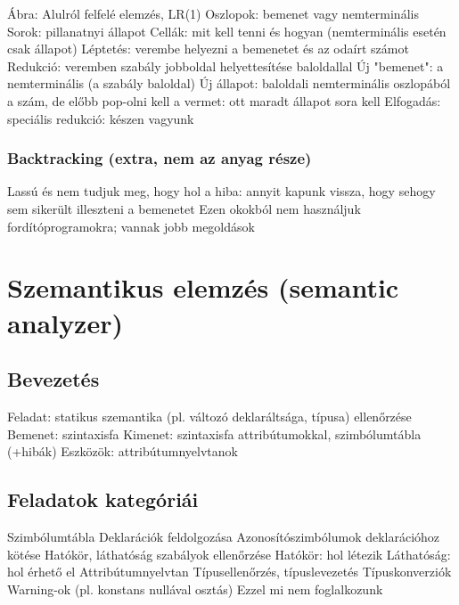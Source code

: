 \documentclass[12pt,a4paper]{article}
\begin{document}
\begin{outline}
	\1 Ábra: Alulról felfelé elemzés, LR(1)
	\2 Oszlopok: bemenet vagy nemterminális
	\2 Sorok: pillanatnyi állapot
	\2 Cellák: mit kell tenni és hogyan (nemterminális esetén csak állapot)
		\3 Léptetés: verembe helyezni a bemenetet és az odaírt számot
		\3 Redukció: veremben szabály jobboldal helyettesítése baloldallal
			\4 Új "bemenet": a nemterminális (a szabály baloldal)
			\4 Új állapot: baloldali nemterminális oszlopából a szám,
			de előbb pop-olni kell a vermet: ott maradt állapot sora kell
		\3 Elfogadás: speciális redukció: készen vagyunk
\end{outline}

\subsubsection{Backtracking (extra, nem az anyag része)}

\begin{outline}
	\1 Lassú és nem tudjuk meg, hogy hol a hiba: annyit kapunk vissza, hogy sehogy sem sikerült illeszteni a bemenetet
	\1 Ezen okokból nem használjuk fordítóprogramokra; vannak jobb megoldások
\end{outline}

\pagebreak

\section{Szemantikus elemzés (semantic analyzer)}

\subsection{Bevezetés}

\begin{outline}
	\1 Feladat: statikus szemantika (pl. változó deklaráltsága, típusa) ellenőrzése
	\1 Bemenet: szintaxisfa
	\1 Kimenet: szintaxisfa attribútumokkal, szimbólumtábla (+hibák)
	\1 Eszközök: attribútumnyelvtanok
\end{outline}

\subsection{Feladatok kategóriái}

\begin{outline}
	\1 Szimbólumtábla
		\2 Deklarációk feldolgozása
		\2 Azonosítószimbólumok deklarációhoz kötése
		\2 Hatókör, láthatóság szabályok ellenőrzése
			\3 Hatókör: hol létezik
			\3 Láthatóság: hol érhető el
	\1 Attribútumnyelvtan
		\2 Típusellenőrzés, típuslevezetés
		\2 Típuskonverziók
	\1 Warning-ok (pl. konstans nullával osztás)
		\2 Ezzel mi nem foglalkozunk
\end{outline}
\end{document}
